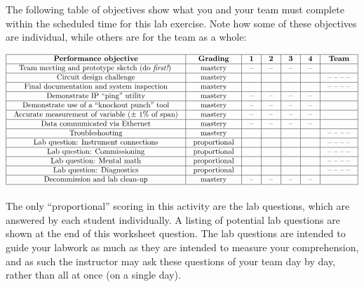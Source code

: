 \begin{itemize}
The following table of objectives show what you and your team must complete within the scheduled time for this lab exercise.  Note how some of these objectives are individual, while others are for the team as a whole:



$$\vbox{\offinterlineskip
\halign{\strut
\vrule \quad\hfil # \ \hfil & 
\vrule \quad\hfil # \ \hfil & 
\vrule \quad\hfil # \ \hfil & 
\vrule \quad\hfil # \ \hfil & 
\vrule \quad\hfil # \ \hfil & 
\vrule \quad\hfil # \ \hfil & 
\vrule \quad\hfil # \ \hfil \vrule \cr
\noalign{\hrule}
%
{\bf Performance objective} & {\bf Grading} & {\bf 1} & {\bf 2} & {\bf 3} & {\bf 4} & {\bf Team} \cr
%
\noalign{\hrule}
%
Team meeting and prototype sketch (do {\it first!}) & mastery & -- & -- & -- & -- & \cr
%
\noalign{\hrule}
%
Circuit design challenge & mastery & & & & & -- -- -- -- \cr
%
\noalign{\hrule}
%
Final documentation and system inspection & mastery & & & & & -- -- -- -- \cr
%
\noalign{\hrule}
%
Demonstrate IP ``ping'' utility & mastery & -- & -- & -- & -- &  \cr
%
\noalign{\hrule}
%
Demonstrate use of a ``knockout punch'' tool & mastery & -- & -- & -- & -- &  \cr
%
\noalign{\hrule}
%
Accurate measurement of variable ($\pm$ 1\% of span) & mastery & -- & -- & -- & -- &  \cr
%
\noalign{\hrule}
%
Data communicated via Ethernet & mastery & -- & -- & -- & -- &  \cr
%
\noalign{\hrule}
%
Troubleshooting & mastery & & & & & -- -- -- -- \cr
%
\noalign{\hrule}
%
Lab question: Instrument connections & proportional &  &  &  &  & -- -- -- -- \cr
%
\noalign{\hrule}
%
Lab question: Commissioning & proportional &  &  &  &  & -- -- -- -- \cr
%
\noalign{\hrule}
%
Lab question: Mental math & proportional &  &  &  &  & -- -- -- -- \cr
%
\noalign{\hrule}
%
Lab question: Diagnostics & proportional &  &  &  &  & -- -- -- -- \cr
%
\noalign{\hrule}
%
Decommission and lab clean-up & mastery & -- & -- & -- & -- &  \cr
%
\noalign{\hrule}
} %
}$$ %

The only ``proportional'' scoring in this activity are the lab questions, which are answered by each student individually.  A listing of potential lab questions are shown at the end of this worksheet question.  The lab questions are intended to guide your labwork as much as they are intended to measure your comprehension, and as such the instructor may ask these questions of your team day by day, rather than all at once (on a single day).


\end{itemize}
